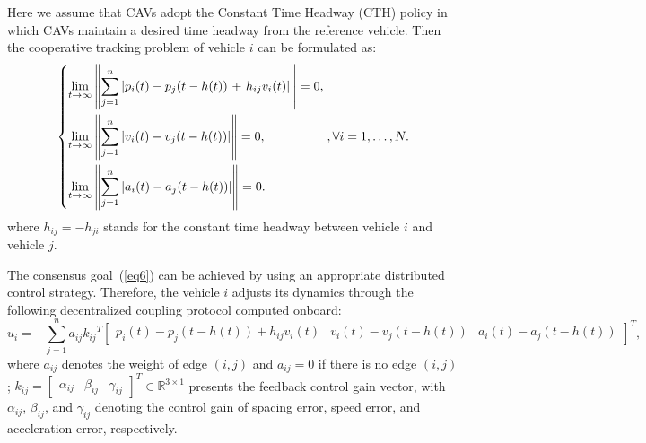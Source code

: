 \documentclass[a4paper]{cas-sc}
\begin{document}
Here we assume that CAVs adopt the Constant Time Headway (CTH) policy in which CAVs maintain a desired time headway from the reference vehicle. Then the cooperative tracking problem of vehicle $i$ can be formulated as:
\begin{equation}
  \left\{ \begin{gathered}
    \mathop {\lim }\limits_{t \to \infty } \left\| {\sum\limits_{j = 1}^n {\left| {{p_i}(t) - {p_j}(t - h(t)){\text{ + }}{h_{ij}}{v_i}(t)} \right|} } \right\| = 0 \hfill, \\
    \mathop {\lim }\limits_{t \to \infty } \left\| {\sum\limits_{j = 1}^n {\left| {{v_i}(t) - {v_j}(t - h(t))} \right|} } \right\| = 0, \hfill \\
    \mathop {\lim }\limits_{t \to \infty } \left\| {\sum\limits_{j = 1}^n {\left| {{a_i}(t) - {a_j}(t - h(t))} \right|} } \right\| = 0. \hfill \\
  \end{gathered}  \right.,\forall i = 1, \ldots ,N.
  \label{eq6}
\end{equation}
where $ {h_{ij}} =  - {h_{ji}} $ stands for the constant time headway between vehicle $i$ and vehicle $j$.

The consensus goal~(\ref{eq6}) can be achieved by using an appropriate distributed control strategy. Therefore, the vehicle $i$ adjusts its dynamics through the following decentralized coupling protocol computed onboard:
\begin{equation}
  {u_i} =  - \sum\limits_{j = 1}^n {{a_{ij}}{k_{ij}}^T{{\left[ {\begin{array}{*{20}{c}}
              {{p_i}\left( t \right) - {p_j}\left( {t - h(t)} \right) + {h_{ij}}{v_i}\left( t \right)} & {{v_i}\left( t \right) - {v_j}\left( {t - h(t)} \right)} & {{a_i}\left( t \right) - {a_j}\left( {t - h(t)} \right)}
            \end{array}} \right]}^T}},
  \label{eq7}
\end{equation}
where $ {a_{ij}} $ denotes the weight of edge $ \left( {i,j} \right) $ and $ {a_{ij}} = 0 $ if there is no edge $ \left( {i,j} \right) $; $ {k_{ij}} = {\left[ {\begin{array}{*{20}{c}}
          {{\alpha _{ij}}} & {{\beta _{ij}}} & {{\gamma _{ij}}}
        \end{array}} \right]^T} \in {\mathbb{R}^{3 \times 1}} $ presents the feedback control gain vector, with $ {\alpha _{ij}} $, $ {\beta _{ij}} $, and $ {\gamma _{ij}} $ denoting the control gain of spacing error, speed error, and acceleration error, respectively.
\end{document}
